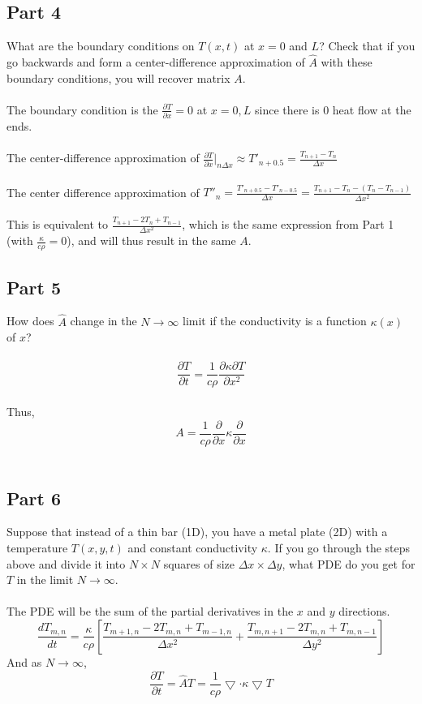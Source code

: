 \documentclass{amsart}
\begin{document}
	\subsection{Part 4}
	What are the boundary conditions on $T(x,t)$ at $x=0$ and $L$? Check that if you go backwards and form a center-difference approximation of $\hat{A}$ with these boundary conditions, you will recover matrix $A$.
	\\\\
	The boundary condition is the $\frac{\partial T}{\partial x} = 0$ at $x=0,L$ since there is 0 heat flow at the ends.
	\\\\
	The center-difference approximation of $\frac{\partial T}{\partial x}|_{n\Delta x} \approx T'_{n+0.5} = \frac{T_{n+1} - T_n}{\Delta x}$
	\\\\
	The center difference approximation of $T''_n = \frac{T'_{n+0.5} - T'_{n-0.5}}{\Delta x} =
	\frac{T_{n+1}-T_n - (T_n - T_{n-1})}{\Delta x^2}$
	\\\\
	This is equivalent to $\frac{T_{n+1} - 2T_n + T_{n-1}}{\Delta x^2}$, which is the same expression from Part 1 (with $\frac{\kappa}{c\rho}=0$), and will thus result in the same $A$.
	\\
	\subsection{Part 5}
	How does $\hat{A}$ change in the $N \rightarrow \infty$ limit if the conductivity is a function $\kappa(x)$ of $x$?
	\\\\
	\[ \frac{\partial T}{\partial t} = \frac{1}{c\rho}\frac{\partial \kappa \partial T}{\partial x^2}
	\]
	\\
	Thus,
	\[A = \frac{1}{c\rho} \frac{\partial}{\partial x}\kappa\frac{\partial}{\partial x}\]\\
	\subsection{Part 6}
	Suppose that instead of a thin bar (1D), you have a metal plate (2D) with a temperature $T(x,y,t)$ and constant conductivity $\kappa$. If you go through the steps above and divide it into $N\times N$ squares of size $\Delta x \times \Delta y$, what PDE do you get for $T$ in the limit $N \rightarrow \infty$.
	\\\\
	The PDE will be the sum of the partial derivatives in the $x$ and $y$ directions.\\
	\[ \frac{dT_{m,n}}{dt} = \frac{\kappa}{c\rho}
	\left[ \frac{T_{m+1,n} - 2T_{m,n} + T_{m-1,n}}{\Delta x^2} + \frac{T_{m,n+1} - 2T_{m,n} + T_{m,n-1}}{\Delta y^2} \right]
	\]
	And as $N \rightarrow \infty$,\\
	\[ \frac{\partial T}{\partial t} = \hat{A}T =  \frac{1}{c\rho}\bigtriangledown \cdot \kappa \bigtriangledown T
	\]
	
\end{document}
